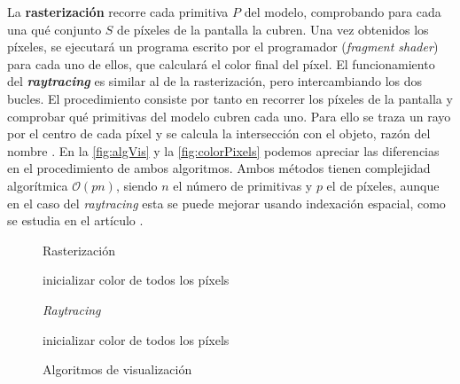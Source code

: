 La \textbf{rasterización} recorre cada primitiva $P$ del modelo, comprobando para cada una qué conjunto $S$ de píxeles de la pantalla la cubren. Una vez obtenidos los píxeles, se ejecutará un programa escrito por el programador (\textit{fragment shader}) para cada uno de ellos, que calculará el color final del píxel. El funcionamiento del \textbf{\textit{raytracing}} es similar al de la rasterización, pero intercambiando los dos bucles. El procedimiento consiste por tanto en recorrer los píxeles de la pantalla y comprobar qué primitivas del modelo cubren cada uno. Para ello se traza un rayo por el centro de cada píxel y se calcula la intersección con el objeto, razón del nombre . En la \autoref{fig:algVis} y la \autoref{fig:colorPixels} podemos apreciar las diferencias en el procedimiento de ambos algoritmos. Ambos métodos tienen complejidad algorítmica $\mathcal{O}(pn)$, siendo $n$ el número de primitivas y $p$ el de píxeles, aunque en el caso del \textit{raytracing} esta se puede mejorar usando indexación espacial, como se estudia en el artículo \cite{indexacion}.\newline

\begin{figure}[ht!]
    \centering
    \begin{minipage}{0.47\textwidth}
        \begin{algorithm}[H]
            \caption{Rasterización}
            inicializar color de todos los píxels
            
        \end{algorithm}
    \end{minipage}%
    \hfill
    \begin{minipage}{0.47\textwidth}
        \begin{algorithm}[H]
            \caption{\textit{Raytracing}}
            inicializar color de todos los píxels
            
        \end{algorithm}
    \end{minipage}%
    \caption{Algoritmos de visualización}
    \label{fig:algVis}
\end{figure}

